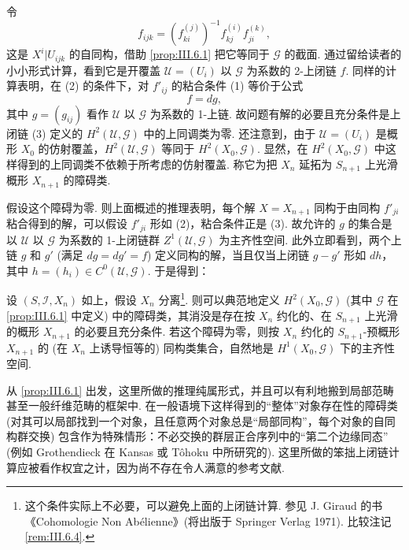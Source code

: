 令
\begin{equation}
f_{ijk} = (f_{ki}^{(j)})^{-1} f_{kj}^{(i)} f_{ji}^{(k)}, \tag{3}
\label{eq:III.3}
\end{equation}
这是 $X^i|U_{ijk}$ 的自同构，借助 \ref{prop:III.6.1} 把它等同于 $\mathcal{G}$ 的截面. 通过留给读者的小小形式计算，看到它是开覆盖 $\mathcal{U} = (U_i)$ 以 $\mathcal{G}$ 为系数的 2-上闭链 $f$. 同样的计算表明，在 (2) 的条件下，对 $f'_{ij}$ 的粘合条件 (1) 等价于公式
\begin{equation}
f = dg, \tag{4}
\label{eq:III.4}
\end{equation}
其中 $g = (g_{ij})$ 看作 $\mathcal{U}$ 以 $\mathcal{G}$ 为系数的 1-上链. 故问题有解的必要且充分条件是上闭链 (3) 定义的 $H^2(\mathcal{U}, \mathcal{G})$ 中的上同调类为零. 还注意到，由于 $\mathcal{U} = (U_i)$ 是概形 $X_0$ 的仿射覆盖，$H^2(\mathcal{U}, \mathcal{G})$ 等同于 $H^2(X_0, \mathcal{G})$. 显然，在 $H^2(X_0, \mathcal{G})$ 中这样得到的上同调类不依赖于所考虑的仿射覆盖. 称它为把 $X_n$ 延拓为 $S_{n+1}$ 上光滑概形 $X_{n+1}$ 的障碍类.

假设这个障碍为零. 则上面概述的推理表明，每个解 $X = X_{n+1}$ 同构于由同构 $f'_{ji}$ 粘合得到的解，可以假设 $f'_{ji}$ 形如 (2)，粘合条件正是 (3). 故允许的 $g$ 的集合是以 $\mathcal{U}$ 以 $\mathcal{G}$ 为系数的 1-上闭链群 $Z^1(\mathcal{U}, \mathcal{G})$ 为主齐性空间. 此外立即看到，两个上链 $g$ 和 $g'$ (满足 $dg = dg' = f$) 定义同构的解，当且仅当上闭链 $g - g'$ 形如 $dh$，其中 $h = (h_i) \in C^0(\mathcal{U}, \mathcal{G})$. 于是得到：

\begin{theorem}\label{thm:III.6.3}
设 $(S, \mathcal{I}, X_n)$ 如上，假设 $X_n$ 分离\footnote{这个条件实际上不必要，可以避免上面的上闭链计算. 参见 J. Giraud 的书《Cohomologie Non Abélienne》(将出版于 Springer Verlag 1971). 比较注记 \ref{rem:III.6.4}.}. 则可以典范地定义 $H^2(X_0, \mathcal{G})$ (其中 $\mathcal{G}$ 在 \ref{prop:III.6.1} 中定义) 中的障碍类，其消没是存在按 $X_n$ 约化的、在 $S_{n+1}$ 上光滑的概形 $X_{n+1}$ 的必要且充分条件. 若这个障碍为零，则按 $X_n$ 约化的 $S_{n+1}$-预概形 $X_{n+1}$ 的 (在 $X_n$ 上诱导恒等的) 同构类集合，自然地是 $H^1(X_0, \mathcal{G})$ 下的主齐性空间.
\end{theorem}

\begin{remark}\label{rem:III.6.4}
从 \ref{prop:III.6.1} 出发，这里所做的推理纯属形式，并且可以有利地搬到局部范畴甚至一般纤维范畴的框架中. 在一般语境下这样得到的``整体''对象存在性的障碍类 (对其可以局部找到一个对象，且任意两个对象总是``局部同构''，每个对象的自同构群交换) 包含作为特殊情形：不必交换的群层正合序列中的``第二个边缘同态'' (例如 Grothendieck 在 Kansas 或 Tôhoku 中所研究的). 这里所做的笨拙上闭链计算应被看作权宜之计，因为尚不存在令人满意的参考文献.
\end{remark}

